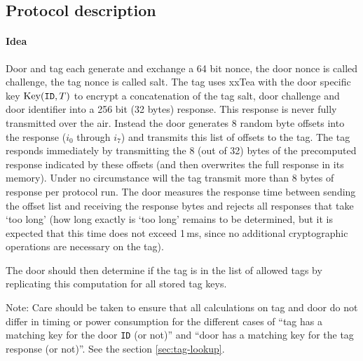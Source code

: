 \documentclass[a4paper,10pt]{scrartcl}
\begin{document}
\subsection{Protocol description}
\paragraph{Idea} Door and tag each generate and exchange a 64 bit nonce, the door nonce is called challenge, the tag nonce is called salt. The tag uses xxTea with the door specific key $\textnormal{Key}(\texttt{ID}, T)$ to encrypt a concatenation of the tag salt, door challenge and door identifier into a 256 bit (32 bytes) response. This response is never fully transmitted over the air. Instead the door generates 8 random byte offsets  into the response ($i_0$ through $i_7$) and transmits this list of offsets to the tag. The tag responds immediately by transmitting the 8 (out of 32) bytes of the precomputed response indicated by these offsets (and then overwrites the full response in its memory). Under no circumstance will the tag transmit more than 8 bytes of response per protocol run. The door measures the response time between sending the offset list and receiving the response bytes and rejects all responses that take `too long' (how long exactly is `too long' remains to be determined, but it is expected that this time does not exceed 1\,ms, since no additional cryptographic operations are necessary on the tag).

The door should then determine if the tag is in the list of allowed tags by replicating this computation for all stored tag keys.

Note: Care should be taken to ensure that all calculations on tag and door do not differ in timing or power consumption for the different cases of ``tag has a matching key for the door \texttt{ID} (or not)'' and ``door has a matching key for the tag response (or not)''. See the section \ref{sec:tag-lookup}.
\end{document}

